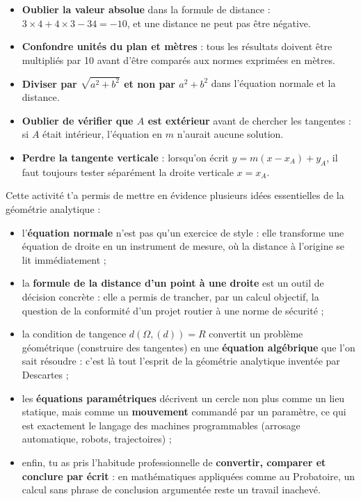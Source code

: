 \documentclass[11pt]{article}
\newcounter{popsec}
\newcounter{popsub}
\newcommand{\courssub}[1]{%
  \stepcounter{popsub}%
  \par\vspace{9pt}\noindent{\popxbold\fontsize{11.5}{13}\selectfont\color{popink}{\color{poporange}\thepopsec.\thepopsub}\hspace{6pt}#1}\par\nopagebreak\vspace{4pt}
}
\begin{document}
\begin{attention}
\begin{itemize}
\item \textbf{Oublier la valeur absolue} dans la formule de distance : $3\times 4 + 4\times 3 - 34 = -10$, et une distance ne peut pas être négative.
\item \textbf{Confondre unités du plan et mètres} : tous les résultats doivent être multipliés par 10 avant d'être comparés aux normes exprimées en mètres.
\item \textbf{Diviser par $\sqrt{a^2+b^2}$ et non par $a^2+b^2$} dans l'équation normale et la distance.
\item \textbf{Oublier de vérifier que $A$ est extérieur} avant de chercher les tangentes : si $A$ était intérieur, l'équation en $m$ n'aurait aucune solution.
\item \textbf{Perdre la tangente verticale} : lorsqu'on écrit $y = m(x-x_A)+y_A$, il faut toujours tester séparément la droite verticale $x = x_A$.
\end{itemize}
\end{attention}

\courssub{Bilan de l'activité}

Cette activité t'a permis de mettre en évidence plusieurs idées essentielles de la géométrie analytique :
\begin{itemize}
\item l'\textbf{équation normale} n'est pas qu'un exercice de style : elle transforme une équation de droite en un instrument de mesure, où la distance à l'origine se lit immédiatement ;
\item la \textbf{formule de la distance d'un point à une droite} est un outil de décision concrète : elle a permis de trancher, par un calcul objectif, la question de la conformité d'un projet routier à une norme de sécurité ;
\item la condition de tangence $d(\Omega,(d)) = R$ convertit un problème géométrique (construire des tangentes) en une \textbf{équation algébrique} que l'on sait résoudre : c'est là tout l'esprit de la géométrie analytique inventée par Descartes ;
\item les \textbf{équations paramétriques} décrivent un cercle non plus comme un lieu statique, mais comme un \textbf{mouvement} commandé par un paramètre, ce qui est exactement le langage des machines programmables (arrosage automatique, robots, trajectoires) ;
\item enfin, tu as pris l'habitude professionnelle de \textbf{convertir, comparer et conclure par écrit} : en mathématiques appliquées comme au Probatoire, un calcul sans phrase de conclusion argumentée reste un travail inachevé.
\end{itemize}
\end{document}
